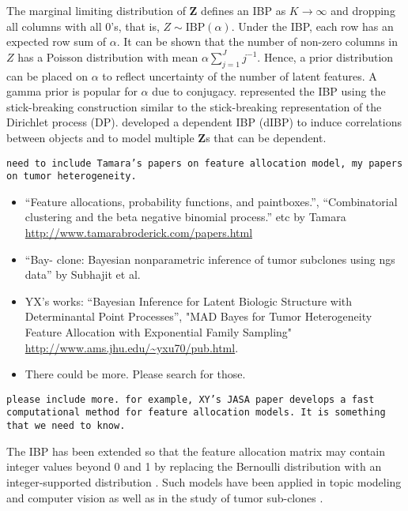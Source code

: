 \documentclass[12pt,]{article}
\def\Z{\bm{Z}}
\begin{document}
The marginal limiting distribution of $\Z$ defines an IBP as $K \rightarrow
\infty$ and dropping all columns with all 0's, that is,  \(Z \sim
\text{IBP}(\alpha)\).
Under the IBP, each row has an expected row sum of $\alpha$.
% 
%
It can be shown that the number of non-zero columns in $Z$ has a Poisson
distribution with mean $\alpha \sum_{j=1}^J j^{-1}$. Hence, a prior
distribution can be placed on \(\alpha\) to reflect uncertainty of the number
of latent features. A gamma prior is popular for $\alpha$ due to conjugacy.
\cite{teh2007stick} represented the IBP using the stick-breaking construction
similar to the stick-breaking representation of the Dirichlet process (DP).
\cite{williamson2010dependent} developed a dependent IBP (dIBP) to induce
correlations between objects and to model multiple $\Z$s that can be dependent.

{\tt need to include Tamara's papers on feature allocation model, my papers on
  tumor heterogeneity. 

\begin{itemize}
\item ``Feature allocations, probability functions, and paintboxes.'',
  ``Combinatorial clustering and the beta negative binomial process.'' etc by
  Tamara \url{http://www.tamarabroderick.com/papers.html}

\item ``Bay- clone: Bayesian nonparametric inference of tumor subclones using
  ngs data'' by Subhajit et al.
 
\item YX's works: ``Bayesian Inference for Latent Biologic Structure with
  Determinantal Point Processes'', "MAD Bayes for Tumor Heterogeneity Feature
  Allocation with Exponential Family Sampling"
  \url{http://www.ams.jhu.edu/~yxu70/pub.html}.

\item There could be more.  Please search for those.
\end{itemize}
}

{\tt please include more. for example, XY's JASA paper develops a fast
computational method for feature allocation models.  It is something that we
need to know.}

The IBP has been extended so that the feature allocation matrix may contain
integer values beyond 0 and 1 by replacing the Bernoulli distribution with an
integer-supported distribution \citep{broderick2013feature}. Such models have
been applied in topic modeling and computer vision
\cite{broderick2015combinatorial} as well as in the study of tumor sub-clones
\citep{sengupta2014bayclone}.
\end{document}

